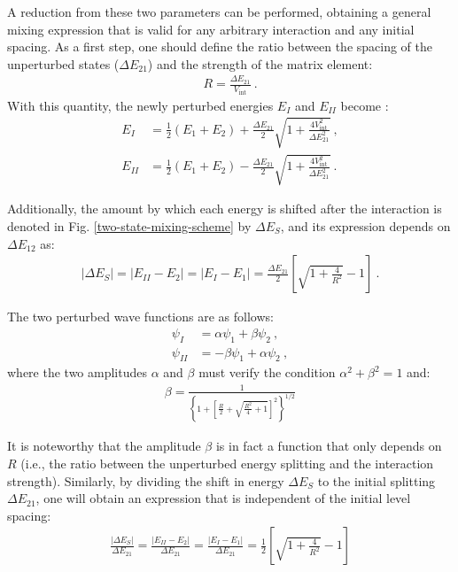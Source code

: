A reduction from these two parameters can be performed, obtaining a general mixing expression that is valid for any arbitrary interaction and any initial spacing. As a first step, one should define the ratio between the spacing of the unperturbed states ($\Delta E_{21}$) and the strength of the matrix element:
\begin{align}
    R=\frac{\Delta E_{21}}{V_\text{int}}\ .
\end{align}
With this quantity, the newly perturbed energies $E_I$ and $E_{II}$ become \cite{casten2000nuclear}:
\begin{align}
    E_I&=\frac{1}{2}(E_1+E_2)+\frac{\Delta E_{21}}{2}\sqrt{1+\frac{4V_\text{int}^2}{\Delta E_{21}^2}}\ ,\\
    E_{II}&=\frac{1}{2}(E_1+E_2)-\frac{\Delta E_{21}}{2}\sqrt{1+\frac{4V_\text{int}^2}{\Delta E_{21}^2}}\ .
    \label{eq-two-state-mixing-energies}
\end{align}

Additionally, the amount by which each energy is shifted after the interaction is denoted in Fig. \ref{two-state-mixing-scheme} by $\Delta E_S$, and its expression depends on $\Delta E_{12}$ as:
\begin{align}
    |\Delta E_S|=|E_{II}-E_2|=|E_{I}-E_1|=\frac{\Delta E_{21}}{2}\left[\sqrt{1+\frac{4}{R^2}}-1\right]\ .
    \label{eq-shift-mixed-states}
\end{align}

The two perturbed wave functions are as follows:
\begin{align}
    \psi_I&=\alpha\psi_1+\beta\psi_2\ ,\nonumber\\
    \psi_{II}&=-\beta\psi_1+\alpha\psi_2\ ,
\end{align}
where the two amplitudes $\alpha$ and $\beta$ must verify the condition $\alpha^2+\beta^2=1$ and:
\begin{align}
    \beta=\frac{1}{\left\{1+\left[\frac{R}{2}+\sqrt{\frac{R^2}{4}+1}\right]^2\right\}^{1/2}}
    \label{eq-beta-mixing-amplitude}
\end{align}

It is noteworthy that the amplitude $\beta$ is in fact a function that only depends on $R$ (i.e., the ratio between the unperturbed energy splitting and the interaction strength). Similarly, by dividing the shift in energy $\Delta E_S$ to the initial splitting $\Delta E_{21}$, one will obtain an expression that is independent of the initial level spacing:
\begin{align}
    \frac{|\Delta E_S|}{\Delta E_{21}}=\frac{|E_{II}-E_{2}|}{\Delta E_{21}}=\frac{|E_{I}-E_{1}|}{\Delta E_{21}}=\frac{1}{2}\left[\sqrt{1+\frac{4}{R^2}}-1\right]
\end{align}

